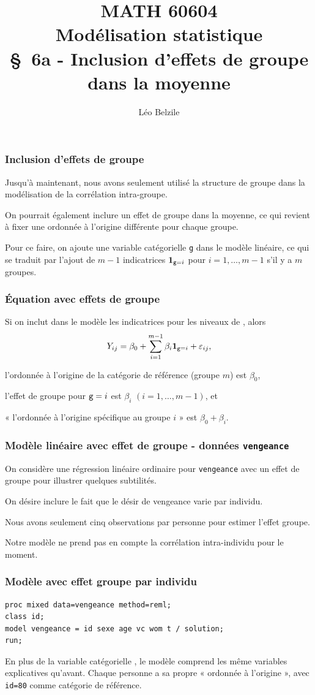 \documentclass{beamer}
\title[\color{white}{MATH 60604 \S~6a - Inclusion d'effets de groupe dans la moyenne}]{\texorpdfstring{MATH 60604 \\Modélisation statistique \\ \S~6a - Inclusion d'effets de groupe dans la moyenne}{MATH 60604 \\Modélisation statistique \\ \S~6a - Inclusion d'effets de groupe dans la moyenne}}
\author{Léo Belzile}
\institute{HEC Montréal\\
Département de sciences de la décision}
\date{}
\begin{document}
\frame{\titlepage}

\begin{frame}
 \frametitle{Inclusion d'effets de groupe}
 \bi 
 \item Jusqu'à maintenant, nous avons seulement utilisé la structure de groupe dans la modélisation de la corrélation intra-groupe.
 \item On pourrait également inclure un \alert{effet de groupe} dans la moyenne, ce qui revient à fixer une ordonnée à l'origine différente pour chaque groupe.
 \item Pour ce faire, on ajoute une variable catégorielle \texttt{g} dans le modèle linéaire, ce qui se traduit par l'ajout de $m-1$ indicatrices ${\mathbf 1}_{\texttt{g}=i}$ pour $i=1, \ldots, m-1$ s'il y a $m$ groupes. 
 \ei 
 \end{frame}
 \begin{frame}
 \frametitle{Équation avec effets de groupe}
 \bi
 \item Si on inclut dans le modèle les indicatrices pour les niveaux de , alors
 \[ Y_{ij}= \beta_0 + \sum_{i=1}^{m-1} \beta_i{\mathbf 1}_{\texttt{g}=i} + \varepsilon_{ij},\]
 \bi \item l'ordonnée à l'origine de la catégorie de référence (groupe $m$) est $\beta_0$,
 \item l'effet de groupe pour $\texttt{g}=i$ est $\beta_i$ $(i=1, \ldots, m-1)$, et 
 \item « l'ordonnée à l'origine spécifique au groupe $i$ » est $\beta_0+ \beta_i$.
 \ei
 \ei
  \end{frame}

\begin{frame}
\frametitle{Modèle linéaire avec effet de groupe - données \texttt{vengeance}}
On considère une régression linéaire ordinaire pour \texttt{vengeance} avec un effet de groupe pour illustrer quelques subtilités.
\bi
\item On désire inclure le fait que le désir de vengeance varie par individu.
\item Nous avons seulement cinq observations par personne pour estimer l'effet groupe.
\item Notre modèle ne prend pas en compte la corrélation intra-individu pour le moment.
\ei
\end{frame}





\begin{frame}[fragile]
\frametitle{Modèle avec effet groupe par individu}
\begin{tcolorbox}[colback=white, colframe=hecblue, title=Code \SASlang pour ajuster un modèle linéaire avec REML]
\begin{verbatim}
proc mixed data=vengeance method=reml; 
class id; 
model vengeance = id sexe age vc wom t / solution; 
run;
\end{verbatim}
\end{tcolorbox}
{\footnotesize En plus de la variable catégorielle , le modèle comprend les même variables explicatives qu'avant. Chaque personne a sa propre « ordonnée à l'origine », avec \texttt{id=80} comme catégorie de référence. 


}
\end{frame}
\end{document}
